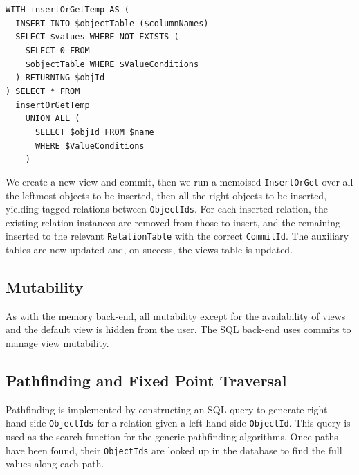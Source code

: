 \documentclass[12pt,a4paper,twoside,openright]{report}
\newcommand\codeName[1]{\texttt{#1}}
\begin{document}
\begin{framed}
\noindent
\mbox{\texttt{WITH insertOrGetTemp AS (}}\\
\mbox{\texttt{~~INSERT INTO \$objectTable (\$columnNames)}}\\
\mbox{\texttt{~~SELECT \$values WHERE NOT EXISTS (}}\\
\mbox{\texttt{~~~~SELECT 0 FROM }}\\
\mbox{\texttt{~~~~\$objectTable WHERE \$ValueConditions}}\\
\mbox{\texttt{~~) RETURNING \$objId}}\\
\mbox{\texttt{) SELECT * FROM}}\\
\mbox{\texttt{~~insertOrGetTemp  }}\\
\mbox{\texttt{~~~~UNION ALL (}}\\
\mbox{\texttt{~~~~~~SELECT \$objId FROM \$name}}\\
\mbox{\texttt{~~~~~~WHERE \$ValueConditions}}\\
\mbox{\texttt{~~~~)}}\\
\end{framed}
	
	We create a new view and commit, then we run a memoised \codeName{InsertOrGet} over all the leftmost objects to be inserted, then all the right objects to be inserted, yielding tagged relations between \codeName{ObjectIds}. For each inserted relation, the existing relation instances are removed from those to insert, and the remaining inserted to the relevant \codeName{RelationTable} with the correct \codeName{CommitId}. The auxiliary tables are now updated and, on success, the views table is updated.

	\subsection{Mutability}
	As with the memory back-end, all mutability except for the availability of views and the default view is hidden from the user. The SQL back-end uses commits to manage view mutability.
	\subsection{Pathfinding and Fixed Point Traversal}
Pathfinding is implemented by constructing an SQL query to generate right-hand-side \codeName{ObjectIds} for a relation given a left-hand-side \codeName{ObjectId}. This query is used as the search function for the generic pathfinding algorithms. Once paths have been found, their \codeName{ObjectIds} are looked up in the database to find the full values along each path.
\end{document}
